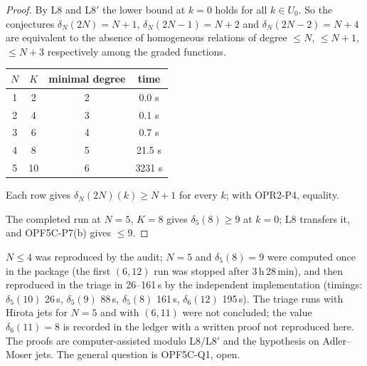 \begin{proof}
By L8 and L8$'$ the lower bound at $k=0$ holds for all $k\in U_0$. So the conjectures $\delta_N(2N)=N+1$, $\delta_N(2N-1)=N+2$ and $\delta_N(2N-2)=N+4$ are equivalent to the absence of homogeneous relations of degree $\le N$, $\le N+1$, $\le N+3$ respectively among the graded functions.

\begin{center}\small
\begin{tabular}{@{}cccc@{}}
\toprule
$N$ & $K$ & minimal degree & time\\ \midrule
1 & 2 & 2 & 0.0 s\\ 2 & 4 & 3 & 0.1 s\\ 3 & 6 & 4 & 0.7 s\\ 4 & 8 & 5 & 21.5 s\\ 5 & 10 & 6 & 3231 s\\ \bottomrule
\end{tabular}
\end{center}
Each row gives $\delta_N(2N)(k)\ge N+1$ for every $k$; with OPR2-P4, equality.

The completed run at $N=5$, $K=8$ gives $\delta_5(8)\ge9$ at $k=0$; L8 transfers it, and OPF5C-P7(b) gives $\le9$.

\end{proof}

\begin{caution}[title=Status of the computations]
$N\le4$ was reproduced by the audit; $N=5$ and $\delta_5(8)=9$ were computed once in the package (the first $(6,12)$ run was stopped after 3\,h\,28\,min), and then reproduced in the triage in 26--161\,s by the independent implementation (timings: $\delta_5(10)$ 26\,s, $\delta_5(9)$ 88\,s, $\delta_5(8)$ 161\,s, $\delta_6(12)$ 195\,s). The triage runs with Hirota jets for $N=5$ and with $(6,11)$ were not concluded; the value $\delta_6(11)=8$ is recorded in the ledger with a written proof not reproduced here. The proofs are computer-assisted modulo L8/L8$'$ and the hypothesis on Adler--Moser jets. The general question is OPF5C-Q1, open.
\end{caution}



